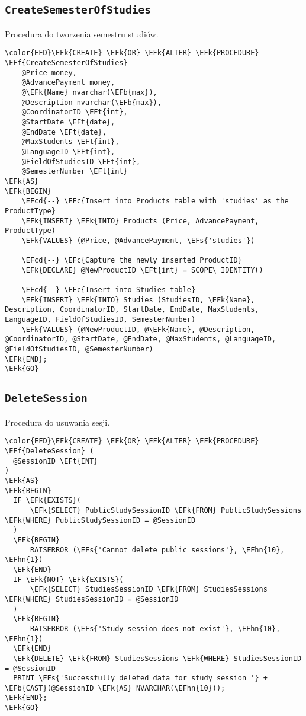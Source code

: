 \documentclass[11pt]{article}
\newcommand{\EFc}[1]{\textcolor{EFc}{\textit{#1}}} %
\newcommand{\EFcd}[1]{\textcolor{EFcd}{\textit{#1}}} %
\newcommand{\EFs}[1]{\textcolor{EFs}{#1}} %
\newcommand{\EFk}[1]{\textcolor{EFk}{\textbf{#1}}} %
\newcommand{\EFb}[1]{\textcolor{EFb}{\textbf{#1}}} %
\newcommand{\EFf}[1]{\textcolor{EFf}{#1}} %
\newcommand{\EFt}[1]{\textcolor{EFt}{\textbf{#1}}} %
\newcommand{\EFhn}[1]{\textcolor{EFhn}{#1}} %
\begin{document}
\subsection{\texttt{CreateSemesterOfStudies}}
\label{sec:orga098d7e}
Procedura do tworzenia semestru studiów.
\begin{Code}
\begin{Verbatim}
\color{EFD}\EFk{CREATE} \EFk{OR} \EFk{ALTER} \EFk{PROCEDURE} \EFf{CreateSemesterOfStudies}
    @Price money,
    @AdvancePayment money,
    @\EFk{Name} nvarchar(\EFb{max}),
    @Description nvarchar(\EFb{max}),
    @CoordinatorID \EFt{int},
    @StartDate \EFt{date},
    @EndDate \EFt{date},
    @MaxStudents \EFt{int},
    @LanguageID \EFt{int},
    @FieldOfStudiesID \EFt{int},
    @SemesterNumber \EFt{int}
\EFk{AS}
\EFk{BEGIN}
    \EFcd{--} \EFc{Insert into Products table with 'studies' as the ProductType}
    \EFk{INSERT} \EFk{INTO} Products (Price, AdvancePayment, ProductType)
    \EFk{VALUES} (@Price, @AdvancePayment, \EFs{'studies'})

    \EFcd{--} \EFc{Capture the newly inserted ProductID}
    \EFk{DECLARE} @NewProductID \EFt{int} = SCOPE\_IDENTITY()

    \EFcd{--} \EFc{Insert into Studies table}
    \EFk{INSERT} \EFk{INTO} Studies (StudiesID, \EFk{Name}, Description, CoordinatorID, StartDate, EndDate, MaxStudents, LanguageID, FieldOfStudiesID, SemesterNumber)
    \EFk{VALUES} (@NewProductID, @\EFk{Name}, @Description, @CoordinatorID, @StartDate, @EndDate, @MaxStudents, @LanguageID, @FieldOfStudiesID, @SemesterNumber)
\EFk{END};
\EFk{GO}
\end{Verbatim}
\end{Code}
\subsection{\texttt{DeleteSession}}
\label{sec:orga9d7d9d}
Procedura do usuwania sesji.
\begin{Code}
\begin{Verbatim}
\color{EFD}\EFk{CREATE} \EFk{OR} \EFk{ALTER} \EFk{PROCEDURE} \EFf{DeleteSession} (
  @SessionID \EFt{INT}
)
\EFk{AS}
\EFk{BEGIN}
  IF \EFk{EXISTS}(
      \EFk{SELECT} PublicStudySessionID \EFk{FROM} PublicStudySessions \EFk{WHERE} PublicStudySessionID = @SessionID
  )
  \EFk{BEGIN}
      RAISERROR (\EFs{'Cannot delete public sessions'}, \EFhn{10}, \EFhn{1})
  \EFk{END}
  IF \EFk{NOT} \EFk{EXISTS}(
      \EFk{SELECT} StudiesSessionID \EFk{FROM} StudiesSessions \EFk{WHERE} StudiesSessionID = @SessionID
  )
  \EFk{BEGIN}
      RAISERROR (\EFs{'Study session does not exist'}, \EFhn{10}, \EFhn{1})
  \EFk{END}
  \EFk{DELETE} \EFk{FROM} StudiesSessions \EFk{WHERE} StudiesSessionID = @SessionID
  PRINT \EFs{'Successfully deleted data for study session '} + \EFb{CAST}(@SessionID \EFk{AS} NVARCHAR(\EFhn{10}));
\EFk{END};
\EFk{GO}
\end{Verbatim}
\end{Code}
\end{document}
